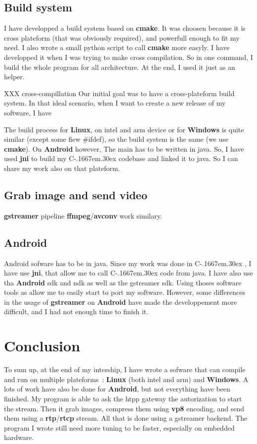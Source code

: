 \documentclass[a4paper,11pt]{custom}
\newcommand{\rtp}{\textbf{rtp}}
\newcommand{\rtcp}{\textbf{rtcp}}
\newcommand{\avconv}{\textbf{avconv}}
\newcommand{\ffmpeg}{\textbf{ffmpeg}}
\newcommand{\gstreamer}{\textbf{gstreamer}}
\newcommand{\vpx}{\textbf{vp8}}
\newcommand{\cmake}{\textbf{cmake}}
\newcommand{\jni}{\textbf{jni}}
\newcommand{\linux}{\textbf{Linux}}
\newcommand{\win}{\textbf{Windows}}
\newcommand{\android}{\textbf{Android}}
\newcommand{\cpp}{%
  C\kern-.1667em\raise.30ex\hbox{\smaller{++}}%
  \spacefactor1000%
}
\begin{document}
\subsection{Build system}

I have developped a build system based on \cmake. It was choosen because it is
cross plateform (that was obviously required), and powerfull enough to fit my
need. I also wrote a small python script to call \cmake{} more easyly. I have
developped it when I was trying to make cross compilation. So in one command, I
build the whole program for all architecture. At the end, I used it just as an
helper.

XXX
cross-compillation
Our initial goal was to have a cross-plateform build system. In that ideal
scenario, when I want to create a new release of my software, I have

The build process for \linux, on intel and arm device or for \win{} is quite
similar (except some fiew \#ifdef), so the build system is the same (we use
\cmake). On \android{} however, The main has to be written in java. So, I have
used \jni{} to build my \cpp{} codebase and linked it to java. So I can share my
work also on that plateform.

\subsection{Grab image and send video}

\gstreamer{} pipeline
\ffmpeg/\avconv{} work similary.

\subsection{Android}

Android sofware has to be in java. Since my work was done in \cpp, I have use
\jni, that allow me to call \cpp code from java. I have also use tha \android{}
sdk and ndk as well as the gstreamer sdk. Using thoses software tools as allow
me to easily start to port my software. However, some differences in the usage
of \gstreamer{} on \android{} have made the developpement more difficult, and I
had not enough time to finish it.

\section{Conclusion}

To sum up, at the end of my intership, I have wrote a sofware that can compile
and run on multiple plateforms~: \linux{} (both intel and arm) and \win. A lots
of work have also be done for \android, but not everything have been finished.
My program is able to ask the htpp gateway the autorization to start the stream.
Then it grab images, compress them using \vpx{} encoding, and send them using a
\rtp{}/\rtcp{} stream. All that is done using a gstreamer backend. The program I
wrote still need more tuning to be faster, especially on embedded hardware.
\end{document}
